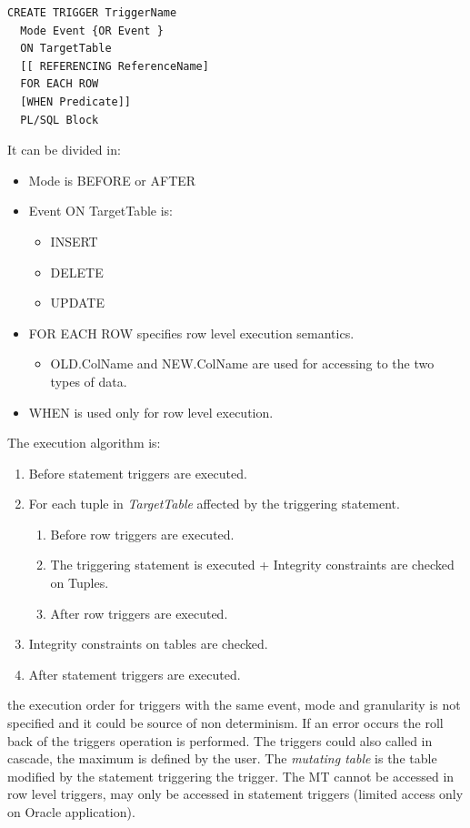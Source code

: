 \documentclass[12pt]{article}
\begin{document}
\begin{lstlisting}[frame=single]
  CREATE TRIGGER TriggerName
  Mode Event {OR Event }
  ON TargetTable
  [[ REFERENCING ReferenceName]
  FOR EACH ROW
  [WHEN Predicate]]
  PL/SQL Block
\end{lstlisting}
It can be divided in:
\begin{itemize}
  \item Mode is BEFORE or AFTER
  \item Event ON TargetTable is:
  \begin{itemize}
    \item INSERT
    \item DELETE
    \item UPDATE
  \end{itemize}
  \item FOR EACH ROW specifies row level execution semantics.
  \begin{itemize}
    \item OLD.ColName and NEW.ColName are used for accessing to the two types of data.
  \end{itemize}
  \item WHEN is used only for row level execution.
\end{itemize}

The execution algorithm is:
\begin{enumerate}
  \item Before statement triggers are executed.
  \item For each tuple in \textit{TargetTable} affected by the triggering statement.
  \begin{enumerate}
    \item Before row triggers are executed.
    \item The triggering statement is executed + Integrity constraints are checked on Tuples.
    \item After row triggers are executed.
  \end{enumerate}
  \item Integrity constraints on tables are checked.
  \item After statement triggers are executed.
\end{enumerate}
the execution order for triggers with the same event, mode and granularity is not specified and it could be source of non determinism. If an error occurs the roll back of the triggers operation is performed. The triggers could also called in cascade, the maximum is defined by the user. The \textit{mutating table} is the table modified by the statement triggering the trigger. The MT cannot be accessed in row level triggers, may only be accessed in statement triggers (limited access only on Oracle application).
\end{document}
